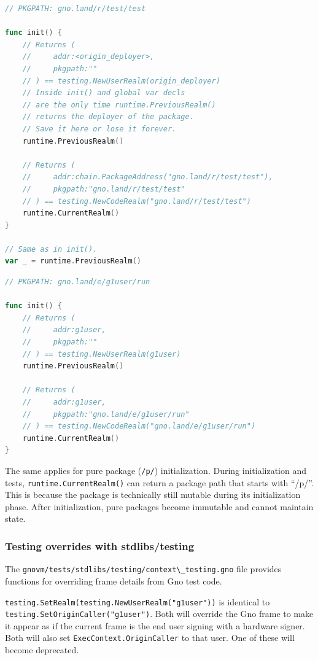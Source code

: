 \documentclass[12pt,a4paper]{article}
\newcommand{\passthrough}[1]{#1}
\begin{document}
\begin{lstlisting}[language=Go]
// PKGPATH: gno.land/r/test/test

func init() {
    // Returns (
    //     addr:<origin_deployer>,
    //     pkgpath:""
    // ) == testing.NewUserRealm(origin_deployer)
    // Inside init() and global var decls
    // are the only time runtime.PreviousRealm()
    // returns the deployer of the package.
    // Save it here or lose it forever.
    runtime.PreviousRealm()

    // Returns (
    //     addr:chain.PackageAddress("gno.land/r/test/test"),
    //     pkgpath:"gno.land/r/test/test"
    // ) == testing.NewCodeRealm("gno.land/r/test/test")
    runtime.CurrentRealm()
}

// Same as in init().
var _ = runtime.PreviousRealm()
\end{lstlisting}

\begin{lstlisting}[language=Go]
// PKGPATH: gno.land/e/g1user/run

func init() {
    // Returns (
    //     addr:g1user,
    //     pkgpath:""
    // ) == testing.NewUserRealm(g1user)
    runtime.PreviousRealm()

    // Returns (
    //     addr:g1user,
    //     pkgpath:"gno.land/e/g1user/run"
    // ) == testing.NewCodeRealm("gno.land/e/g1user/run")
    runtime.CurrentRealm()
}
\end{lstlisting}

The same applies for pure package (\passthrough{\lstinline!/p/!})
initialization. During initialization and tests,
\passthrough{\lstinline!runtime.CurrentRealm()!} can return a package
path that starts with ``/p/''. This is because the package is
technically still mutable during its initialization phase. After
initialization, pure packages become immutable and cannot maintain
state.

\subsubsection{Testing overrides with
stdlibs/testing}\label{testing-overrides-with-stdlibstesting}

The
\passthrough{\lstinline!gnovm/tests/stdlibs/testing/context\_testing.gno!}
file provides functions for overriding frame details from Gno test code.

\passthrough{\lstinline!testing.SetRealm(testing.NewUserRealm("g1user"))!}
is identical to
\passthrough{\lstinline!testing.SetOriginCaller("g1user")!}. Both will
override the Gno frame to make it appear as if the current frame is the
end user signing with a hardware signer. Both will also set
\passthrough{\lstinline!ExecContext.OriginCaller!} to that user. One of
these will become deprecated.
\end{document}
